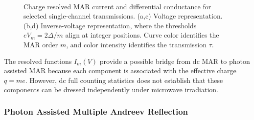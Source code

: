             \begin{figure}[t]
                \centering
                \hfill
                \\
                \hfill
                \caption{
                        Charge resolved MAR current and differential conductance for selected single-channel transmissions.
                        (a,c) Voltage representation.
                        (b,d) Inverse-voltage representation, where the thresholds $eV_m=2\Delta/m$ align at integer positions.
                        Curve color identifies the MAR order $m$, and color intensity identifies the transmission $\tau$.
                    }
                \label{fig:meso:fcs-m}
            \end{figure}

            The resolved functions $I_m(V)$ provide a possible bridge from dc MAR to photon assisted MAR because each component is associated with the effective charge $q=me$. However, dc full counting statistics does not establish that these components can be dressed independently under microwave irradiation.

        \subsubsection*{Photon Assisted Multiple Andreev Reflection}

